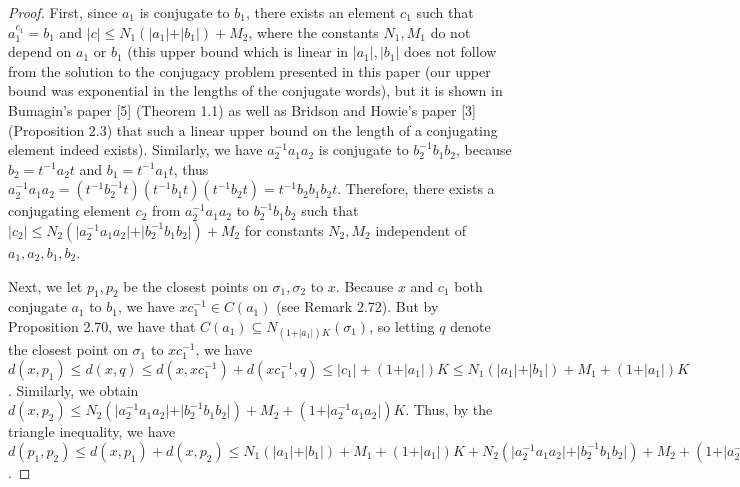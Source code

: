 \documentclass[12pt]{article}
\newcommand{\vs}{\vskip10pt}
\begin{document}
\begin{proof}
		First, since $a_1$ is conjugate to $b_1$, there exists an element $c_1$ such that $a_1^{c_1} = b_1$ and $\vert c \vert \leq N_1 (\vert a_1 \vert + \vert b_1 \vert) + M_2$, where the constants $N_1, M_1$ do not depend on $a_1$ or $b_1$ (this upper bound which is linear in $\vert a_1 \vert, \vert b_1 \vert$ does not follow from the solution to the conjugacy problem presented in this paper (our upper bound was exponential in the lengths of the conjugate words), but it is shown in Bumagin's paper [5] (Theorem 1.1) as well as Bridson and Howie's paper [3] (Proposition 2.3) that such a linear upper bound on the length of a conjugating element indeed exists). Similarly, we have $a_2^{-1} a_1 a_2$ is conjugate to $b_2^{-1} b_1 b_2$, because $b_2 = t^{-1} a_2 t$ and $b_1 = t^{-1} a_1 t$, thus $a_2^{-1} a_1 a_2 = (t^{-1} b_2^{-1} t) (t^{-1} b_1 t) (t^{-1} b_2 t) = t^{-1} b_2 b_1 b_2 t$. Therefore, there exists a conjugating element $c_2$ from $a_2^{-1} a_1 a_2$ to $b_2^{-1} b_1 b_2$ such that $\vert c_2 \vert \leq N_2 (\vert a_2^{-1} a_1 a_2 \vert + \vert b_2^{-1} b_1 b_2 \vert) + M_2$ for constants $N_2, M_2$ independent of $a_1,a_2,b_1,b_2$.  
				
		\vs 
		
		Next, we let $p_1, p_2$ be the closest points on $\sigma_1, \sigma_2$ to $x$. Because $x$ and $c_1$ both conjugate $a_1$ to $b_1$, we have $xc _1^{-1} \in C(a_1)$ (see Remark 2.72). But by Proposition 2.70, we have that $C(a_1) \subseteq N_{(1 + \vert a_1 \vert)K}(\sigma_1)$, so letting $q$ denote the closest point on $\sigma_1$ to $xc_1^{-1}$, we have $d(x, p_1) \leq d(x, q) \leq d(x, xc_1^{-1}) + d(xc_1^{-1}, q) \leq \vert c_1 \vert + (1 + \vert a_1 \vert)K \leq N_1 (\vert a_1 \vert + \vert b_1 \vert) + M_1 + (1 + \vert a_1 \vert)K$. Similarly, we obtain $d(x, p_2) \leq N_2 (\vert a_2^{-1} a_1 a_2 \vert + \vert b_2^{-1} b_1 b_2 \vert) + M_2 + (1 + \vert a_2 ^{-1} a_1 a_2 \vert)K$. Thus, by the triangle inequality, we have $d(p_1, p_2) \leq d(x, p_1) + d(x, p_2) \leq N_1 (\vert a_1 \vert + \vert b_1 \vert) + M_1 + (1 + \vert a_1 \vert)K + N_2 (\vert a_2^{-1} a_1 a_2 \vert + \vert b_2^{-1} b_1 b_2 \vert) + M_2 + (1 + \vert a_2 ^{-1} a_1 a_2 \vert)K \leq N_1 (\vert a_1 \vert + \vert b_1 \vert) + M_1 + (1 + \vert a_1 \vert)K + N_2 (\vert a_1 \vert + \vert b_1 \vert + 2 \vert a_2 \vert + 2 \vert b_2 \vert) + M_2 + (1 + \vert a_1 \vert + 2 \vert a_2 \vert)K \leq 2(N_1 + N_2) (\vert a_1 \vert + \vert a_2 \vert + \vert b_1 \vert + \vert b_2 \vert) + M_1 + M_2 + 2K(1 + \vert a_1 \vert + \vert a_2 \vert) \leq 2(N_1 + N_2 + K) (\vert a_1 \vert + \vert a_2 \vert + \vert b_1 \vert + \vert b_2 \vert) + M_1 + M_2$. 
		

\end{proof}
\end{document}
